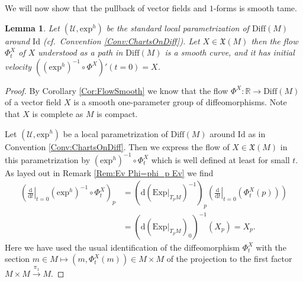 \documentclass[12pt,a4paper]{article}
\theoremstyle{plain}
\newtheorem{lemma}[theorem]{Lemma}
\theoremstyle{definition}
\newcommand{\R}{\mathbb{R}}
\newcommand{\VFs}{\mathfrak{X}(M)}
\newcommand{\Diff}{\mathrm{Diff}(M)}
\newcommand{\exh}{\mathrm{exp}^h}
\newcommand{\Id}{\mathrm{Id}}
\newcommand{\Ucal}{\mathcal{U}}
\renewcommand{\d}{\mathrm{d}}
\begin{document}
We will now show that the pullback of vector fields and $1$-forms is smooth tame.

\begin{lemma}
\label{Lemma:FlowInitialVelocity}
Let $(\Ucal,\exh)$ be the standard local parametrization of $\Diff$ around $\Id$ (cf.~Convention \ref{Conv:ChartsOnDiff}). Let $X\in \VFs$ then the flow $\Phi^X_t$ of $X$ understood as a path in $\Diff$ is a smooth curve, and it has initial velocity $((\exh)^{-1}\circ \Phi^X)'(t=0)=X$.
\end{lemma}
\begin{proof}
By Corollary \ref{Cor:FlowSmooth} we know that the flow $\Phi^X:\R\to \Diff$ of a vector field $X$ is a smooth one-parameter group of diffeomorphisms. Note that $X$ is complete as $M$ is compact.

Let $(\Ucal,\exh)$ be a local parametrization of $\Diff$ around $\Id$ as in Convention \ref{Conv:ChartsOnDiff}. Then we express the flow of $X\in \VFs$ in this parametrization by $(\exh)^{-1}\circ\Phi^X_t$ which is well defined at least for small $t$. As layed out in Remark \ref{Rem:Ev Phi=phi_p Ev} we find
\begin{align*}
    \left(\left.\frac{\d}{\d t}\right|_{t=0}(\exh)^{-1}\circ\Phi^X_t\right)_p&=(\d(\left.\mathrm{Exp}\right|_{T_pM})^{-1})_p\left(\left.\frac{\d}{\d t}\right|_{t=0}(\Phi_t^X(p))\right)\\
    &=(\d(\left.\mathrm{Exp}\right|_{T_pM})_0)^{-1}(X_p)=X_p.
\end{align*}
Here we have used the usual identification of the diffeomorphism $\Phi^X_t$ with the section $m\in M\mapsto (m,\Phi_t^X(m))\in M\times M$ of the projection to the first factor $M\times M\xrightarrow{\pi_1}M$.    
\end{proof}
\end{document}
